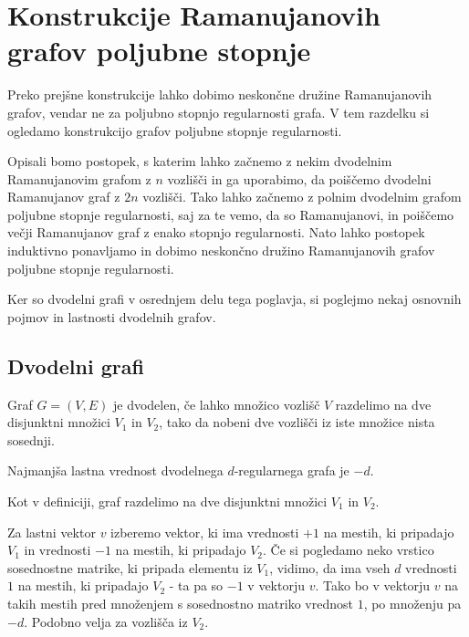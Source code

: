 \section{Konstrukcije Ramanujanovih grafov poljubne stopnje}
Preko prejšne konstrukcije lahko dobimo neskončne družine Ramanujanovih grafov, vendar ne za poljubno stopnjo regularnosti grafa. V tem razdelku si ogledamo konstrukcijo grafov poljubne stopnje regularnosti.

Opisali bomo postopek, s katerim lahko začnemo z nekim dvodelnim Ramanujanovim grafom z \(n\) vozlišči in ga uporabimo, da poiščemo dvodelni Ramanujanov graf z \(2n\) vozlišči. Tako lahko začnemo z polnim dvodelnim grafom poljubne stopnje regularnosti, saj za te vemo, da so Ramanujanovi, in poiščemo večji Ramanujanov graf z enako stopnjo regularnosti. Nato lahko postopek induktivno ponavljamo in dobimo neskončno družino Ramanujanovih grafov poljubne stopnje regularnosti.

Ker so dvodelni grafi v osrednjem delu tega poglavja, si poglejmo nekaj osnovnih pojmov in lastnosti dvodelnih grafov.
\subsection{Dvodelni grafi}
\begin{definicija}
    Graf \(G = (V, E)\) je dvodelen, če lahko množico vozlišč \(V\) razdelimo na dve disjunktni množici \(V_1\) in \(V_2\), tako da nobeni dve vozlišči iz iste množice nista sosednji.
\end{definicija}

\begin{izrek}
    Najmanjša lastna vrednost dvodelnega \(d\)-regularnega grafa je \(-d\).
\end{izrek}
\begin{dokaz}
    Kot v definiciji, graf razdelimo na dve disjunktni množici \(V_1\) in \(V_2\).

    Za lastni vektor \(v\) izberemo vektor, ki ima vrednosti \(+1\) na mestih, ki pripadajo \(V_1\) in vrednosti \(-1\) na mestih, ki pripadajo \(V_2\). Če si pogledamo neko vrstico sosednostne matrike, ki pripada elementu iz \(V_1\), vidimo, da ima vseh \(d\) vrednosti \(1\) na mestih, ki pripadajo \(V_2\) - ta pa so \(-1\) v vektorju \(v\). Tako bo v vektorju \(v\) na takih mestih pred množenjem s sosednostno matriko vrednost \(1\), po množenju pa \(-d\). Podobno velja za vozlišča iz \(V_2\).
\end{dokaz}

